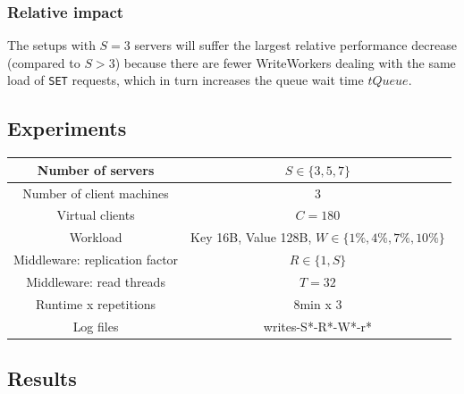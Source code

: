 \documentclass[11pt]{article}
\newcommand{\set}[0]{\texttt{SET}}
\begin{document}
\subsubsection{Relative impact}
The setups with $S=3$ servers will suffer the largest relative performance decrease (compared to $S > 3$) because there are fewer WriteWorkers dealing with the same load of \set{} requests, which in turn increases the queue wait time $tQueue$.

\subsection{Experiments}
\begin{center}
\small{
\smallskip
\begin{tabular}{|c|c|}
\hline Number of servers & $S \in \{3, 5, 7\}$ \\ 
\hline Number of client machines & 3 \\ 
\hline Virtual clients & $C=180$ \\ 
\hline Workload & Key 16B, Value 128B, $W \in \{1\%, 4\%, 7\%, 10\%\}$ \\
\hline Middleware: replication factor & $R \in \{1, S\}$ \\ 
\hline Middleware: read threads & $T=32$ \\ 
\hline Runtime x repetitions & 8min x 3 \\ 
\hline Log files & writes-S*-R*-W*-r* \\
\hline 
\end{tabular} }
\end{center}

\subsection{Results}
\end{document}
